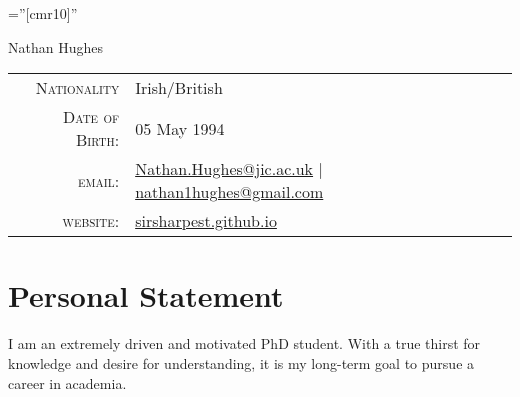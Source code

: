 \documentclass[a4paper,10pt]{article}
\begin{document}

\pagestyle{empty} %

\font\fb=''[cmr10]'' %


\par{\centering
  \vspace{-2ex}
  {\Huge Nathan {Hughes}
  }\bigskip\par}


\begin{center}
  \begin{tabular}{rl}
    \textsc{Nationality} & Irish/British  \\
    \textsc{Date of Birth:} & 05                May 1994 \\
    \textsc{email:}     & \href{mailto:Nathan.Hughes@jic.ac.uk}{Nathan.Hughes@jic.ac.uk} | \href{mailto:nathan1hughes@gmail.com}{nathan1hughes@gmail.com} \\
    \textsc{website:}  & \href{sirsharpest.github.io}{sirsharpest.github.io}
  \end{tabular}
\end{center}


\section{Personal Statement}
I am an extremely driven and motivated PhD student. With a true thirst for knowledge and desire for understanding, it is my long-term goal to pursue a career in academia.
\end{document}
